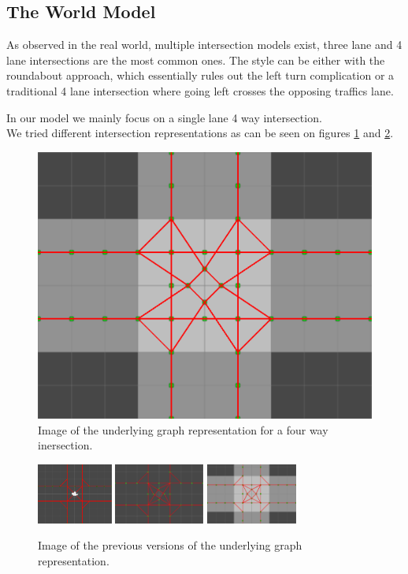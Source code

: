 \subsection{The World Model}
As observed in the real world, multiple intersection models exist, three lane and 4 lane intersections are the most common ones.
The style can be either with the roundabout approach, which essentially rules out the left turn complication or a traditional 4 lane intersection where going left crosses the opposing traffics lane.

In our model we mainly focus on a single lane 4 way intersection.\\ We tried different intersection representations as can be seen on figures \ref{figure:graph} and \ref{figure:graphs}.

\begin{figure}
\centering
\includegraphics[scale=.4]{img/graph.png}
\caption{Image of the underlying graph representation for a four way inersection.}
\label{figure:graph}
\end{figure}

\begin{figure}
\centering
\includegraphics[height=75px]{img/graph-old1.png}
\includegraphics[height=75px]{img/graph-old2.png}
\includegraphics[height=75px]{img/graph-old3.png}
\caption{Image of the previous versions of the underlying graph representation.}
\label{figure:graphs}
\end{figure}

